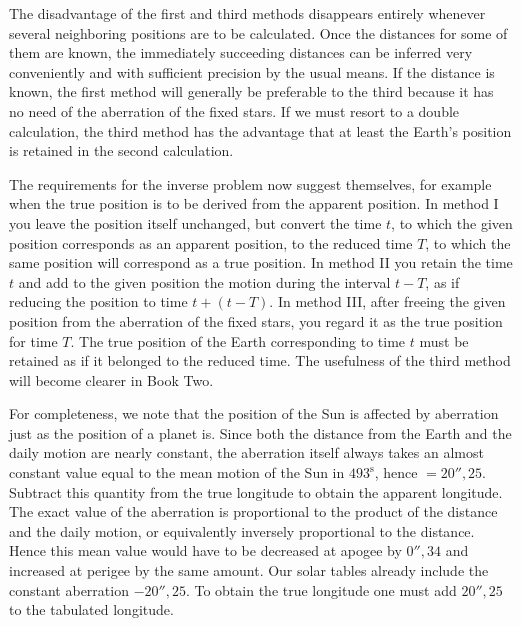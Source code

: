 The disadvantage of the first and third methods disappears entirely whenever several neighboring positions are to be calculated. Once the distances for some of them are known, the immediately succeeding distances can be inferred very conveniently and with sufficient precision by the usual means. If the distance is known, the first method will generally be preferable to the third because it has no need of the aberration of the fixed stars. If we must resort to a double calculation, the third method has the advantage that at least the Earth's position is retained in the second calculation.

The requirements for the inverse problem now suggest themselves, for example when the true position is to be derived from the apparent position. In method I you leave the position itself unchanged, but convert the time $t$, to which the given position corresponds as an apparent position, to the reduced time $T$, to which the same position will correspond as a true position. In method II you retain the time $t$ and add to the given position the motion during the interval $t-T$, as if reducing the position to time $t+(t-T)$. In method III, after freeing the given position from the aberration of the fixed stars, you regard it as the true position for time $T$. The true position of the Earth corresponding to time $t$ must be retained as if it belonged to the reduced time. The usefulness of the third method will become clearer in Book Two.

For completeness, we note that the position of the Sun is affected by aberration just as the position of a planet is. Since both the distance from the Earth and the daily motion are nearly constant, the aberration itself always takes an almost constant value equal to the mean motion of the Sun in $493^{\mathrm{s}}$, hence $=20''{,}25$. Subtract this quantity from the true longitude to obtain the apparent longitude. The exact value of the aberration is proportional to the product of the distance and the daily motion, or equivalently inversely proportional to the distance. Hence this mean value would have to be decreased at apogee by $0''{,}34$ and increased at perigee by the same amount. Our solar tables already include the constant aberration $-20''{,}25$. To obtain the true longitude one must add $20''{,}25$ to the tabulated longitude.


